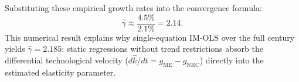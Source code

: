 \documentclass[11pt,a4paper]{article}
\begin{document}
Substituting these empirical growth rates into the convergence formula:
\begin{equation}
\hat{\gamma} \approx \frac{4.5\%}{2.1\%} = 2.14.
\end{equation}
This numerical result explains why single-equation IM-OLS over the full century yields $\hat{\gamma} = 2.185$: static regressions without trend restrictions absorb the differential technological velocity ($d\hat{k}/dt = g_{\text{ME}} - g_{\text{NRC}}$) directly into the estimated elasticity parameter.
\end{document}
